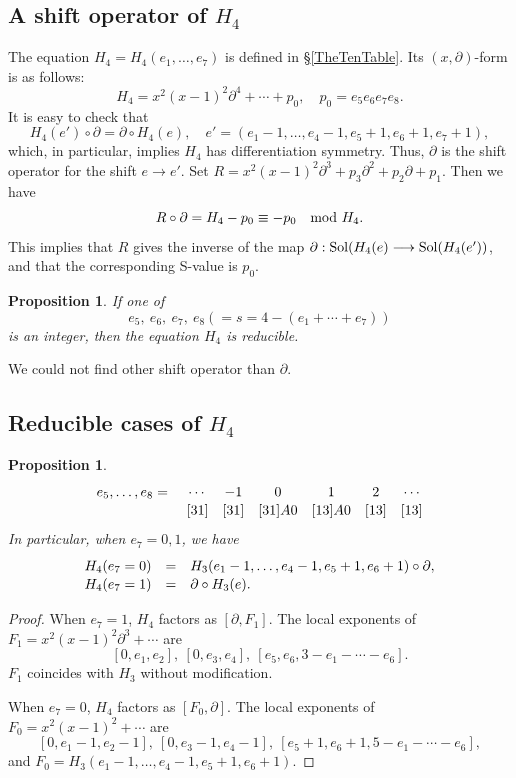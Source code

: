 \documentclass[a4paper,12pt]{article}
\newtheorem{prp}[thm]{Proposition}
\theoremstyle{definition}
\theoremstyle{remark}
\numberwithin{equation}{section} %
\begin{document}
\subsection{A shift operator of $H_4$}
The equation $H_4=H_4(e_1,\dots,e_7)$ is defined in \S\ref{TheTenTable}.
Its $(x,\partial)$-form is as follows:
  $$H_4=x^2(x-1)^2\partial^4+\cdots+p_0,\quad p_0= e_5e_6e_7e_8.$$
It is easy to check that 
\[H_4(e') \circ \partial = \partial\circ H_4(e),
\quad e'=(e_1-1,\dots,e_4-1,e_5+1,e_6+1,e_7+1),
\]
which, in particular, implies $H_4$ has differentiation symmetry.
Thus, $\partial$ is the shift operator for the shift $e\to e'.$
Set $R=x^2(x-1)^2\partial^3+p_3\partial^2+p_2\partial+p_1$. Then we have
  \[R\circ \partial = H_4-p_0 \equiv -p_0\quad{\rm mod}\ H_4.\]
  This implies that $R$ gives the inverse of the map
  $\partial:{\rm Sol}(H_4(e)\longrightarrow {\rm Sol}(H_4(e'))$,
  and that the corresponding S-value is $p_0$.

\begin{prp}\label{E4red}If one of
  $$e_5,\ e_6,\ e_7,\ e_8(=s=4-(e_1+\cdots+e_7))$$ is an integer,
  then the equation $H_4$ is reducible.
  \end{prp}

We could not find other shift operator than $\partial$.

\subsection{Reducible cases of $H_4$}\label{E4ap1Red} 

\begin{prp}\label{E4redE3}
\[\def\arraystretch{1.1} \begin{array}{cccccccc}
e_5,\dots,e_8=\ & \cdots   &-1    & 0     & 1     & 2        &\cdots\\
  &   [31]    & [31] &[31]A0&[13]A0 &[13]&  [13]  
\end{array}
\]
  In particular, when $e_7=0,1$, we have
\[\def\arraystretch{1.1} \begin{array}{lcl}H_4(e_7=0)&=&
    H_3(e_1-1,\dots,e_4-1,e_5+1,e_6+1)\circ\partial,\\
    H_4(e_7=1)&=& \partial\circ H_3(e).
\end{array}\]
\end{prp}

\begin{proof} When $e_7=1$, $H_4$ factors as $[\partial, F_1]$.
  The local exponents of $F_1=x^2(x-1)^2\partial^3+\cdots$ are
$$[0,e_1,e_2],\ [0,e_3,e_4],\ [e_5,e_6,3-e_1-\cdots-e_6].$$
$F_1$ coincides with $H_3$ without modification. 
\par\noindent
When $e_7=0$, $H_4$ factors as $[F_0,\partial]$. The local exponents of $F_0=x^2(x-1)^2+\cdots$ are
$$[0,e_1-1,e_2-1],\ [0,e_3-1,e_4-1],\ [e_5+1,e_6+1,5-e_1-\cdots-e_6],$$
and  $F_0=H_3(e_1-1, \dots, e_4-1, e_5+1, e_6+1)$.
\end{proof} %
\end{document}
